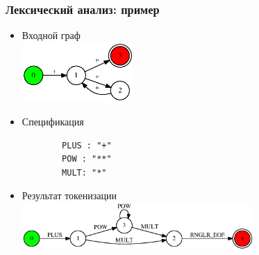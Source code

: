 \documentclass{beamer}
\begin{document}
\begin{frame}[fragile]
	\transwipe[direction=90]
	\frametitle{Лексический анализ: пример}
	\begin{itemize}
		\item Входной граф
		\\
    \includegraphics[width=120pt]{picts/InputGraph.eps}
 		\item Спецификация
 		\\
 		\begin{verbatim}
 		PLUS : "+"
 		POW : "**"
 		MULT: "*"
 		\end{verbatim}
		\item Результат токенизации
    \\
    \includegraphics[width=250pt]{picts/TestInterpretParser.eps}

	\end{itemize}
\end{frame}
\end{document}
